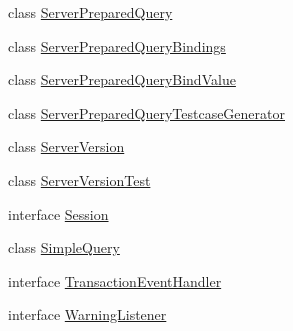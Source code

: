 \begin{DoxyCompactItemize}
class \mbox{\hyperlink{classcom_1_1mysql_1_1cj_1_1_server_prepared_query}{Server\+Prepared\+Query}}
\item 
class \mbox{\hyperlink{classcom_1_1mysql_1_1cj_1_1_server_prepared_query_bindings}{Server\+Prepared\+Query\+Bindings}}
\item 
class \mbox{\hyperlink{classcom_1_1mysql_1_1cj_1_1_server_prepared_query_bind_value}{Server\+Prepared\+Query\+Bind\+Value}}
\item 
class \mbox{\hyperlink{classcom_1_1mysql_1_1cj_1_1_server_prepared_query_testcase_generator}{Server\+Prepared\+Query\+Testcase\+Generator}}
\item 
class \mbox{\hyperlink{classcom_1_1mysql_1_1cj_1_1_server_version}{Server\+Version}}
\item 
class \mbox{\hyperlink{classcom_1_1mysql_1_1cj_1_1_server_version_test}{Server\+Version\+Test}}
\item 
interface \mbox{\hyperlink{interfacecom_1_1mysql_1_1cj_1_1_session}{Session}}
\item 
class \mbox{\hyperlink{classcom_1_1mysql_1_1cj_1_1_simple_query}{Simple\+Query}}
\item 
interface \mbox{\hyperlink{interfacecom_1_1mysql_1_1cj_1_1_transaction_event_handler}{Transaction\+Event\+Handler}}
\item 
interface \mbox{\hyperlink{interfacecom_1_1mysql_1_1cj_1_1_warning_listener}{Warning\+Listener}}
\end{DoxyCompactItemize}
